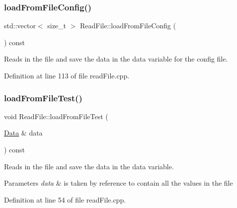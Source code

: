 \mbox{\label{class_read_file_acae54464293fba0c2f0adcd9d878a176}} 
\subsubsection{\texorpdfstring{load\+From\+File\+Config()}{loadFromFileConfig()}}
{\footnotesize\ttfamily std\+::vector$<$ size\+\_\+t $>$ Read\+File\+::load\+From\+File\+Config (\begin{DoxyParamCaption}{ }\end{DoxyParamCaption}) const}



Reads in the file and save the data in the data variable for the config file. 



Definition at line 113 of file read\+File.\+cpp.

\mbox{\label{class_read_file_ac629f612ecfb04a6ef4414d5feb995bd}} 
\subsubsection{\texorpdfstring{load\+From\+File\+Test()}{loadFromFileTest()}}
{\footnotesize\ttfamily void Read\+File\+::load\+From\+File\+Test (\begin{DoxyParamCaption}\item[{\mbox{\hyperlink{struct_data}{Data}} \&}]{data }\end{DoxyParamCaption}) const}



Reads in the file and save the data in the data variable. 


\begin{DoxyParams}{Parameters}
{\em data} & is taken by reference to contain all the values in the file \\
\hline
\end{DoxyParams}


Definition at line 54 of file read\+File.\+cpp.

\mbox{\label{class_read_file_a0ac546e0980ee76612480df922728880}} 
